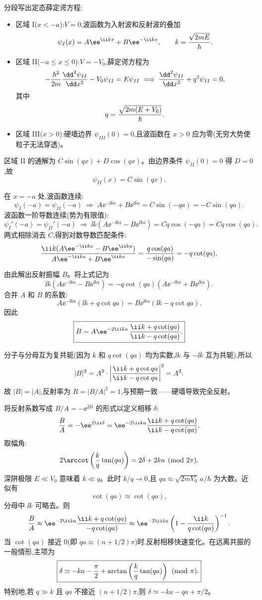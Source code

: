\begin{solution}
分段写出定态薛定谔方程:
\begin{itemize}
\item 区域 I($x<-a$):$V=0$,波函数为入射波和反射波的叠加
\[
\psi_I(x)=A\ee^{\ii kx}+B\ee^{-\ii kx},\qquad k={\sqrt{2mE}\over\hbar}.
\]
\item 区域 II($-a\le x\le 0$):$V=-V_0$,薛定谔方程为
\[
-{\hbar^2\over2m}{\dd^2\psi_{II}\over\dd x^2}-V_0\psi_{II}=E\psi_{II}
\;\Longrightarrow\;
{\dd^2\psi_{II}\over\dd x^2}+q^2\psi_{II}=0,
\]
其中
\[
q={\sqrt{2m(E+V_0)}\over\hbar}.
\]
\item 区域 III($x>0$):硬墙边界 $\psi_{III}(0)=0$,且波函数在 $x>0$ 应为零(无穷大势使粒子无法穿透)。
\end{itemize}

区域 II 的通解为 $C\sin(qx)+D\cos(qx)$。由边界条件 $\psi_{II}(0)=0$ 得 $D=0$,故
\[
\psi_{II}(x)=C\sin(qx).
\]

在 $x=-a$ 处,波函数连续:
\[
\psi_I(-a)=\psi_{II}(-a)\;\Longrightarrow\;A\ee^{-\ii ka}+B\ee^{\ii ka}=C\sin(-qa)=-C\sin(qa).
\]
波函数一阶导数连续(势为有限值):
\[
\psi_I'(-a)=\psi_{II}'(-a)\;\Longrightarrow\;
\ii k(A\ee^{-\ii ka}-B\ee^{\ii ka})=Cq\cos(-qa)=Cq\cos(qa).
\]
两式相除消去 $C$,得到对数导数匹配条件:
\[
{\ii k(A\ee^{-\ii ka}-B\ee^{\ii ka})\over A\ee^{-\ii ka}+B\ee^{\ii ka}}={q\cos(qa)\over-\sin(qa)}=-q\cot(qa).
\]

由此解出反射振幅 $B$。将上式记为
\[
\ii k(A\ee^{-\ii ka}-B\ee^{\ii ka})=-q\cot(qa)(A\ee^{-\ii ka}+B\ee^{\ii ka}).
\]
合并 $A$ 和 $B$ 的系数:
\[
A\ee^{-\ii ka}(\ii k+q\cot qa)=B\ee^{\ii ka}(\ii k-q\cot qa).
\]
因此
\[
\boxed{B=A\ee^{-2\ii ka}\,{\ii k+q\cot(qa)\over\ii k-q\cot(qa)}.}
\]

分子与分母互为复共轭(因为 $k$ 和 $q\cot(qa)$ 均为实数,$\ii k$ 与 $-\ii k$ 互为共轭),所以
\[
|B|^2=A^2\cdot\left|{\ii k+q\cot qa\over\ii k-q\cot qa}\right|^2=A^2.
\]
故 $|B|=|A|$,反射率为 $R=|B/A|^2=1$,与预期一致——硬墙导致完全反射。

将反射系数写成 $B/A=-\ee^{2\ii\delta}$ 的形式以定义相移 $\delta$:
\[
{B\over A}=-\ee^{2\ii\delta}=\ee^{-2\ii ka}{\ii k+q\cot(qa)\over\ii k-q\cot(qa)}.
\]
取幅角:
\[
2\arccot\left({k\over q}\tan(qa)\right)=2\delta+2ka\pmod{2\pi}.
\]
深阱极限 $E\ll V_0$ 意味着 $k\ll q$。此时 $k/q\to0$,且 $qa\approx\sqrt{2mV_0}\,a/\hbar$ 为大数。近似有
\[
\cot(qa)\approx\cot\left(qa\right),
\]
分母中 $\ii k$ 可略去。则
\[
{B\over A}\approx \ee^{-2\ii ka}{\ii k+q\cot(qa)\over -q\cot(qa)}\approx \ee^{-2\ii ka}\left(1-{\ii k\over q\cot(qa)}\right)^{-1}.
\]
当 $\cot(qa)$ 接近 $0$(即 $qa\approx (n+1/2)\pi$)时,反射相移快速变化。在远离共振的一般情形,主项为
\[
\boxed{\delta\simeq -ka-{\pi\over2}+\arctan\left({k\over q}\tan(qa)\right)\pmod{\pi}.}
\]
特别地,若 $q\gg k$ 且 $qa$ 不接近 $(n+1/2)\pi$,则 $\delta\simeq -ka-qa+\pi/2$。
\end{solution}

